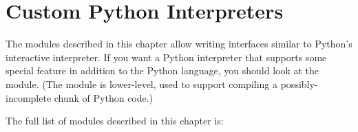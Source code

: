 \chapter{Custom Python Interpreters}
\label{custominterp}

The modules described in this chapter allow writing interfaces similar
to Python's interactive interpreter.  If you want a Python interpreter
that supports some special feature in addition to the Python language,
you should look at the  module.  (The 
module is lower-level, used to support compiling a possibly-incomplete
chunk of Python code.)

The full list of modules described in this chapter is:

\localmoduletable
